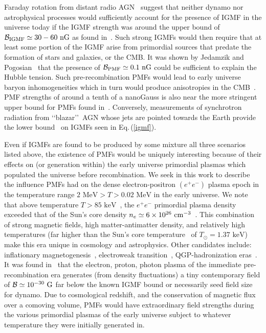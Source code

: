 \documentclass[a4paper]{article}
\newcommand*{\MeV}{\text{ MeV}}
\newcommand*{\keV}{\text{ keV}}
\newcommand{\req}[1]{Eq.\,(\ref{#1})}
\begin{document}
Faraday rotation from distant radio AGN~\cite{pomakov2022redshift} suggest that neither dynamo nor astrophysical processes would sufficiently account for the presence of IGMF in the universe today if the IGMF strength was around the upper bound of ${\cal B}_{\rm IGMF}\simeq30-60{\rm\ nG}$ as found in~\cite{vernstrom2021discovery}. Such strong IGMFs would then require that at least some portion of the IGMF arise from primordial sources that predate the formation of stars and galaxies, or the CMB. It was shown by Jedamzik and Pogosian~\cite{jedamzik2020relieving} that the presence of ${\cal B}_{\rm PMF}\simeq0.1{\rm\ nG}$ could be sufficient to explain the Hubble tension. Such pre-recombination PMFs would lead to early universe baryon inhomogeneities which in turn would produce anisotropies in the CMB~\cite{jedamzik2013smallscale}. PMF strengths of around a tenth of a nanoGauss is also near the more stringent upper bound for PMFs found in~\cite{pshirkov2015new,jedamzik2019stringent}. Conversely, measurements of synchrotron radiation from \lq\lq blazar\rq\rq\ AGN whose jets are pointed towards the Earth provide the lower bound~\cite{neronov2010evidence,taylor2011extragalactic} on IGMFs seen in \req{igmf}.


Even if IGMFs are found to be produced by some mixture all three scenarios listed above, the existence of PMFs would be uniquely interesting because of their effects on (or generation within) the early universe primordial plasmas which populated the universe before recombination. We seek in this work to describe the influence PMFs had on the dense electron-positron $(e^{+}e^{-})$ plasma epoch in the temperature range $2\MeV>T>0.02\MeV$ in the early universe. We note that above temperature $T>85\keV$~\cite{rafelski2023short}, the $e^{+}e^{-}$ primordial plasma density exceeded that of the Sun's core density $n_{e}\simeq6\times10^{26}{\rm\ cm}^{-3}$~\cite{bahcall2001solar}. This combination of strong magnetic fields, high matter-antimatter density, and relatively high temperatures (far higher than the Sun's core temperature~\cite{castellani1997solar} of $T_{\odot}=1.37\keV$) make this era unique in cosmology and astrophysics. Other candidates include: inflationary magnetogenesis~\cite{subramanian2009magnetic}, electroweak transition~\cite{vachaspati2020progress}, QGP-hadronization eras~\cite{bali2011qcd}. It was found in~\cite{gopal2004generation} that the electron, proton, photon plasma of the immediate pre-recombination era generates (from density fluctuations) a tiny contemporary field of ${\cal B}\simeq10^{-30}{\rm\ G}$ far below the known IGMF bound or necessarily seed field size for dynamo. Due to cosmological redshift, and the conservation of magnetic flux over a comoving volume, PMFs would have extraordinary field strengths during the various primordial plasmas of the early universe subject to whatever temperature they were initially generated in.
\end{document}
